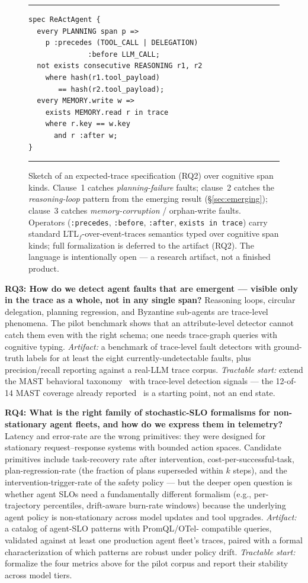 \documentclass[10pt,conference]{IEEEtran}
\begin{document}
\begin{figure}[t]
\small
\hrule\vspace{2pt}
\begin{verbatim}
spec ReActAgent {
  every PLANNING span p =>
    p :precedes (TOOL_CALL | DELEGATION)
              :before LLM_CALL;
  not exists consecutive REASONING r1, r2
    where hash(r1.tool_payload)
       == hash(r2.tool_payload);
  every MEMORY.write w =>
    exists MEMORY.read r in trace
    where r.key == w.key
      and r :after w;
}
\end{verbatim}
\vspace{-4pt}\hrule
\caption{Sketch of an expected-trace specification (RQ2) over
cognitive span kinds. Clause~1 catches \emph{planning-failure}
faults; clause~2 catches the \emph{reasoning-loop} pattern from the
emerging result (\S\ref{sec:emerging}); clause~3 catches
\emph{memory-corruption} / orphan-write faults. Operators
(\texttt{:precedes}, \texttt{:before}, \texttt{:after},
\texttt{exists~in~trace}) carry standard LTL$_f$-over-event-traces
semantics typed over cognitive span kinds; full formalization is
deferred to the artifact (RQ2). The language is intentionally open ---
a research artifact, not a finished product.}
\label{fig:spec}
\end{figure}

\textbf{RQ3: How do we detect agent faults that are emergent --- visible
only in the trace as a whole, not in any single span?}
Reasoning loops, circular delegation, planning regression, and
Byzantine sub-agents are trace-level phenomena. The pilot benchmark
shows that an attribute-level detector cannot catch them even with
the right schema; one needs trace-graph queries with cognitive
typing. \emph{Artifact:} a benchmark of trace-level fault detectors
with ground-truth labels for at least the eight currently-undetectable
faults, plus precision/recall reporting against a real-LLM trace
corpus. \emph{Tractable start:} extend the MAST behavioral
taxonomy~\cite{mast} with trace-level detection signals --- the
12-of-14 MAST coverage already reported~\cite{anon_taxonomy_2026} is a
starting point, not an end state.

\textbf{RQ4: What is the right family of stochastic-SLO formalisms
for non-stationary agent fleets, and how do we express them in
telemetry?}
Latency and error-rate are the wrong primitives: they were designed
for stationary request--response systems with bounded action spaces.
Candidate primitives include task-recovery rate after intervention,
cost-per-successful-task, plan-regression-rate (the fraction of plans
superseded within $k$ steps), and the intervention-trigger-rate of
the safety policy --- but the deeper open question is whether agent
SLOs need a fundamentally different formalism (e.g., per-trajectory
percentiles, drift-aware burn-rate windows) because the underlying
agent policy is non-stationary across model updates and tool
upgrades.
\emph{Artifact:} a catalog of agent-SLO patterns with PromQL/OTel-
compatible queries, validated against at least one production agent
fleet's traces, paired with a formal characterization of which
patterns are robust under policy drift. \emph{Tractable start:}
formalize the four metrics above for the pilot corpus and report
their stability across model tiers.
\end{document}
